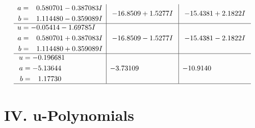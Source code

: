 \documentclass[1p]{elsarticle_modified}
\theoremstyle{definition}
\begin{document}
$$\begin{array}{c|c|c}
\begin{aligned}
a &= \phantom{-}0.580701 - 0.387083 I \\
b &= \phantom{-}1.114480 - 0.359089 I\end{aligned}
 & -16.8509 + 1.5277 I & -15.4381 + 2.1822 I \\ \hline\begin{aligned}
u &= -0.05414 - 1.69785 I \\
a &= \phantom{-}0.580701 + 0.387083 I \\
b &= \phantom{-}1.114480 + 0.359089 I\end{aligned}
 & -16.8509 - 1.5277 I & -15.4381 - 2.1822 I \\ \hline\begin{aligned}
u &= -0.196681\phantom{ +0.000000I} \\
a &= -5.13644\phantom{ +0.000000I} \\
b &= \phantom{-}1.17730\phantom{ +0.000000I}\end{aligned}
 & -3.73109\phantom{ +0.000000I} & -10.9140\phantom{ +0.000000I}\\
 \hline 
 \end{array}$$\newpage
\newpage\renewcommand{\arraystretch}{1}
\centering \section*{ IV. u-Polynomials}
\end{document}
